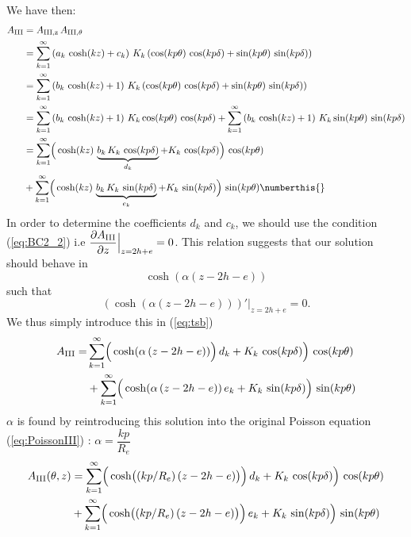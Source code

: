 We have then:
\begin{align*}
A_{\rm III} &= A_{\rm III, z}\, A_{\rm III, \theta} \\
&= \sum\limits_{k=1}^{\infty} \left( a_k\, \cosh(kz) + c_k \right)\,K_k \left( \cos(kp\theta)\, \cos(kp\delta) +
\sin(kp\theta)\, \sin(kp\delta) \right) \\
&= \sum\limits_{k=1}^{\infty} \left( b_k\, \cosh(kz) + 1 \right)\,K_k \left( \cos(kp\theta)\, \cos(kp\delta) +
\sin(kp\theta)\, \sin(kp\delta) \right) \\
&= \sum\limits_{k=1}^{\infty} \left( b_k\, \cosh(kz) + 1 \right)\,K_k \cos(kp\theta)\, \cos(kp\delta) + \sum\limits_{k=1}^{\infty} \left( b_k\, \cosh(kz) + 1 \right)\,K_k \sin(kp\theta)\, \sin(kp\delta)  \\
&= \sum\limits_{k=1}^{\infty}\Bigr( \cosh(kz)\, \underbrace{ b_k\, K_k\, \cos(kp\delta)}_{d_k} + K_k\, \cos(kp\delta) \Bigr)\, \cos(kp\theta) \\
&+ \sum\limits_{k=1}^{\infty}\Bigr( \cosh(kz)\, \underbrace{ b_k\, K_k\, \sin(kp\delta)}_{e_k} + K_k\, \sin(kp\delta) \Bigr)\, \sin(kp\theta) \numberthis{} \label{eq:tsb}
\end{align*}
\noindent
In order to determine the coefficients $d_k$ and $c_k$, we should use the condition (\ref{eq:BC2_2}) i.e $\dfrac{\partial A_{\rm III}}{\partial z}\Bigr\rvert_{z = 2h+e} = 0$. This relation suggests that our solution should behave in $$\cosh(\alpha(z-2h-e))$$ such that $$\left( \cosh(\alpha(z-2h-e)) \right)'\Bigr\rvert_{z = 2h+e} = 0.$$ We thus simply introduce this in (\ref{eq:tsb})
\begin{align*}
 A_{\rm III} =& \sum\limits_{k=1}^{\infty}\Bigr( \cosh(\alpha\, (z-2h-e)) \Bigr)\,
d_k + K_k\, \cos(kp\delta) \Bigr)\, \cos(kp\theta) 
\\&+ \sum\limits_{k=1}^{\infty}\Bigr( \cosh(\alpha\, (z-2h-e))\,
e_k + K_k\, \sin(kp\delta) \Bigr)\, \sin(kp\theta)
\end{align*}
$\alpha$ is found by reintroducing this solution into the original Poisson equation (\ref{eq:PoissonIII}) : $\alpha = \dfrac{kp}{R_e}$
\begin{align*}
A_{\rm III} (\theta, z) 
&= \sum\limits_{k=1}^{\infty}\Bigr( \cosh \bigr((kp/R_e)\, (z-2h-e)\bigr) \Bigr)\,
d_k + K_k\, \cos(kp\delta) \Bigr)\, \cos(kp\theta) \\
&+ \sum\limits_{k=1}^{\infty}\Bigr( \cosh \bigr((kp/R_e)\, (z-2h-e)\bigr) \Bigr)\,
e_k + K_k\, \sin(kp\delta) \Bigr)\, \sin(kp\theta)
\end{align*}

